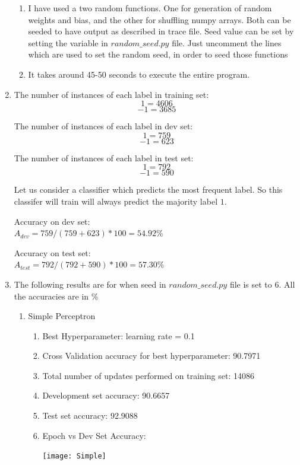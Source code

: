 \begin{enumerate}
\begin{enumerate}
			\item
			I have used a two random functions. One for generation of random weights and bias, and the other for shuffling numpy arrays. Both can be seeded to have output as described in trace file.
			Seed value can be set by setting the variable in $random\_seed.py$ file. Just uncomment the lines which are used to set the random seed, in order to seed those functions
			
			\item 
			It takes around 45-50 seconds to execute the entire program. 
		\end{enumerate}	
	
	\item
	The number of instances of each label in training set:
	$$1 	= 4606 $$
	$$-1 = 3685 $$
	
	The number of instances of each label in dev set:
	$$1 	= 759 $$
	$$-1 = 623 $$
	
	The number of instances of each label in test set:
	$$1 	= 792 $$
	$$-1 = 590 $$
	
	Let us consider a classifier which predicts the most frequent label. So this classifer will train will always predict the majority label $1$.
	
	Accuracy on dev set: \\
	$A_{dev} = 759/(759+623)*100 = 54.92 \%$
	
	Accuracy on test set: \\
	$A_{test} = 792/(792+590)*100 = 57.30 \%$
	
	\item
	The following results are for when seed in $random\_seed.py$ file is set to 6. All the accuracies are in $\%$
	\begin{enumerate}
		\item Simple Perceptron
			\begin{enumerate}
				\item Best Hyperparameter: learning rate = 0.1
				\item Cross Validation accuracy for best hyperparameter: 90.7971
				\item Total number of updates performed on training set: 14086
				\item Development set accuracy: 90.6657
				\item Test set accuracy: 92.9088
				\item Epoch vs Dev Set Accuracy:
					\begin{center}
						\texttt{[image: Simple]}
					\end{center}
			\end{enumerate}
			

\end{enumerate}
\end{enumerate}
